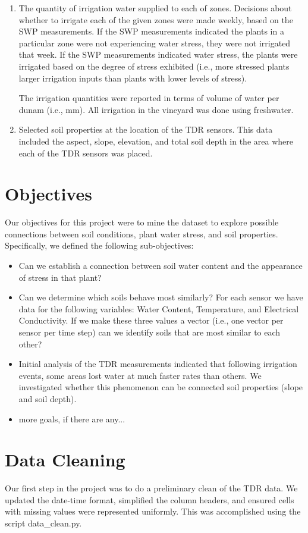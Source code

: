 \documentclass[12pt]{scrartcl}
\begin{document}
\begin{enumerate}
\item The quantity of irrigation water supplied to each of zones. Decisions about whether to irrigate each of the given zones were made weekly, based on the SWP measurements. If the SWP measurements indicated the plants in a particular zone were not experiencing water stress, they were not irrigated that week. If the SWP measurements indicated water stress, the plants were irrigated based on the degree of stress exhibited (i.e., more stressed plants larger irrigation inputs than plants with lower levels of stress).

The irrigation quantities were reported in terms of volume of water per dunam (i.e., mm). All irrigation in the vineyard was done using freshwater.

 \item Selected soil properties at the location of the TDR sensors. This data included the aspect, slope, elevation, and total soil depth in the area where each of the TDR sensors was placed.
\end{enumerate}

\section{Objectives}
Our objectives for this project were to mine the dataset to explore possible connections between soil conditions, plant water stress, and soil properties. Specifically, we defined the following sub-objectives:
\begin{itemize}
\item Can we establish a connection between soil water content and the appearance of stress in that plant?
\item Can we determine which soils behave most similarly? For each sensor we have data for the following variables: Water Content, Temperature, and Electrical Conductivity. If we make these three values a vector (i.e., one vector per sensor per time step) can we identify soils that are most similar to each other?
\item Initial analysis of the TDR measurements indicated that following irrigation events, some areas lost water at much faster rates than others. We investigated whether this phenomenon can be connected soil properties (slope and soil depth).
\item more goals, if there are any...
\end{itemize}

\section{Data Cleaning}
Our first step in the project was to do a preliminary clean of the TDR data. We updated the date-time format, simplified the column headers, and ensured cells with missing values were represented uniformly. This was accomplished using the script data\_clean.py.
\end{document}
